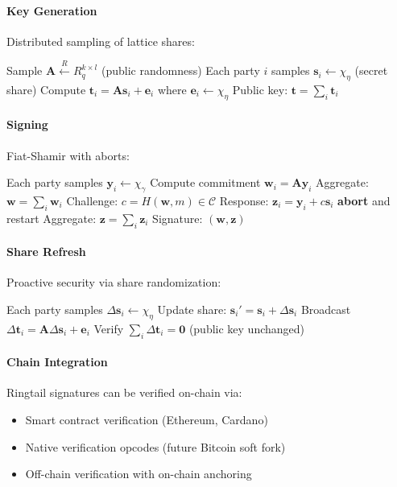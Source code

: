 \documentclass[11pt,twocolumn]{article}
\begin{document}
\paragraph{Key Generation} Distributed sampling of lattice shares:
\begin{algorithmic}[1]
\State Sample $\mathbf{A} \xleftarrow{R} R_q^{k \times l}$ (public randomness)
\State Each party $i$ samples $\mathbf{s}_i \leftarrow \chi_\eta$ (secret share)
\State Compute $\mathbf{t}_i = \mathbf{A} \mathbf{s}_i + \mathbf{e}_i$ where $\mathbf{e}_i \leftarrow \chi_\eta$
\State Public key: $\mathbf{t} = \sum_i \mathbf{t}_i$
\end{algorithmic}

\paragraph{Signing} Fiat-Shamir with aborts:
\begin{algorithmic}[1]
\State Each party samples $\mathbf{y}_i \leftarrow \chi_\gamma$
\State Compute commitment $\mathbf{w}_i = \mathbf{A} \mathbf{y}_i$
\State Aggregate: $\mathbf{w} = \sum_i \mathbf{w}_i$
\State Challenge: $c = H(\mathbf{w}, m) \in \mathcal{C}$
\State Response: $\mathbf{z}_i = \mathbf{y}_i + c \mathbf{s}_i$
 \textbf{abort} and restart
\EndIf
\State Aggregate: $\mathbf{z} = \sum_i \mathbf{z}_i$
\State Signature: $(\mathbf{w}, \mathbf{z})$
\end{algorithmic}

\paragraph{Share Refresh} Proactive security via share randomization:
\begin{algorithmic}[1]
\State Each party samples $\Delta \mathbf{s}_i \leftarrow \chi_\eta$
\State Update share: $\mathbf{s}_i' = \mathbf{s}_i + \Delta \mathbf{s}_i$
\State Broadcast $\Delta \mathbf{t}_i = \mathbf{A} \Delta \mathbf{s}_i + \mathbf{e}_i$
\State Verify $\sum_i \Delta \mathbf{t}_i = \mathbf{0}$ (public key unchanged)

\end{algorithmic}

\paragraph{Chain Integration} Ringtail signatures can be verified on-chain via:
\begin{itemize}
\item Smart contract verification (Ethereum, Cardano)
\item Native verification opcodes (future Bitcoin soft fork)
\item Off-chain verification with on-chain anchoring
\end{itemize}
\end{document}
